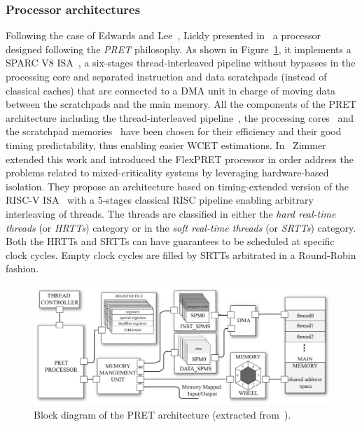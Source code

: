 \documentclass[main.tex]{subfiles}
\begin{document}
\subsubsection{Processor architectures}
Following the case of Edwards and Lee~\cite{Edwards2007}, Lickly \etal
presented in~\cite{Lickly2008} a processor designed following the \emph{PRET}
philosophy. As shown in Figure~\ref{fig_stateOfTheArt_PRETarchi}, it implements
a SPARC V8 ISA~\cite{SparcV8}, a six-stages thread-interleaved pipeline without
bypasses in the processing core and separated instruction and data scratchpads
(instead of classical caches) that are connected to a DMA unit in charge of
moving data between the scratchpads and the main memory. All the components of
the PRET architecture including the thread-interleaved pipeline~\cite{Fort2006,
Labrecque2007}, the processing cores~\cite{Ip2006} and the scratchpad
memories~\cite{Benini2000} have been chosen for their efficiency and their good
timing predictability, thus enabling easier WCET estimations.
In~\cite{Zimmer2014} Zimmer \etal extended this work and introduced the
FlexPRET processor in order address the problems related to mixed-criticality
systems by leveraging hardware-based isolation. They propose an architecture
based on timing-extended version of the RISC-V ISA~\cite{RISCV} with a 5-stages
classical RISC pipeline enabling arbitrary interleaving of threads. The threads
are classified in either the \emph{hard real-time threads} (or \emph{HRTTs})
category or in the \emph{soft real-time threads} (or \emph{SRTTs}) category.
Both the HRTTs and SRTTs can have guarantees to be scheduled at specific clock
cycles. Empty clock cycles are filled by SRTTs arbitrated in a Round-Robin
fashion. \\

\begin{figure}
    \centering
    \includegraphics[width=15cm]{imgs/png/stateOfTheArt_PRETarchi.png}
    \caption{Block diagram of the PRET architecture (extracted
    from~\cite{Lickly2008}).}
    \label{fig_stateOfTheArt_PRETarchi}
\end{figure}
\end{document}
